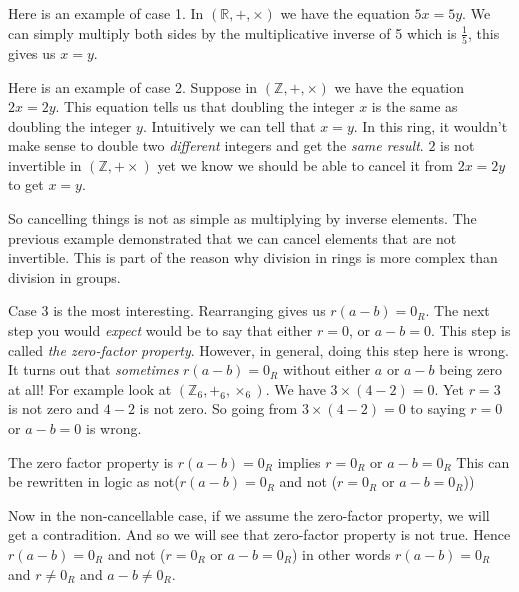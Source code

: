 \frmrule


\begin{example}
Here is an example of case 1. In $(\mathbb{R}, +, \times)$ we have the equation $5x = 5y$.
We can simply multiply both sides by the multiplicative inverse of 5 which is $\frac{1}{5}$, this gives us $x=y$. 
\end{example}

\frmrule

\begin{example}
Here is an example of case 2. Suppose in $(\mathbb{Z}, +, \times)$ we have the equation $2x = 2y$. This equation tells us that 
doubling the integer $x$ is the same as doubling the integer $y$. Intuitively we can tell that 
$x = y$. In this ring, it wouldn't make sense to double two \textit{different} integers and get the \textit{same result}. 
$2$ is not invertible in $(\mathbb{Z}, + \times)$ yet we know we should be able to cancel it from $2x = 2y$ to get $x = y$.
\end{example}

\frmrule

So cancelling things is not as simple as multiplying by inverse elements. The previous example 
demonstrated that we can cancel elements that are not invertible. This is part of the reason why 
division in rings is more complex than division in groups. 

\begin{example}
Case 3 is the most interesting. Rearranging gives us $r(a-b) = 0_R$. The next step
you would \textit{expect} would be to say that either $r = 0$, or $a-b = 0$. 
This step is called \textit{the zero-factor property}.
However, in general, doing this step here is wrong. It turns out 
that \textit{sometimes} $r(a-b) = 0_R$ without either $a$ or $a-b$ being zero at all! 
For example look at $(\mathbb{Z}_6, +_6, \times_{6})$.
We have $3 \times (4-2) = 0$. Yet $r = 3$ is not zero and $4-2$ is not zero. 
So going from $3 \times (4-2) = 0$ to saying $r = 0$ or $a - b = 0$ is wrong. 
\end{example}


\frmrule

The zero factor property is $r(a-b) = 0_R$ implies $r = 0_R$ or $a-b = 0_R$
This can be rewritten in logic as not($r(a-b) = 0_R$ and not ($r = 0_R$ or $a-b = 0_R$))


Now in the non-cancellable case, if we assume the zero-factor property, we will get a contradition.
And so we will see that zero-factor property is not true. 
Hence  $r(a-b) = 0_R$ and not ($r = 0_R$ or $a-b = 0_R$)
in other words $r(a-b) = 0_R$ and $r \neq 0_R$ and $a-b \neq 0_R$.


